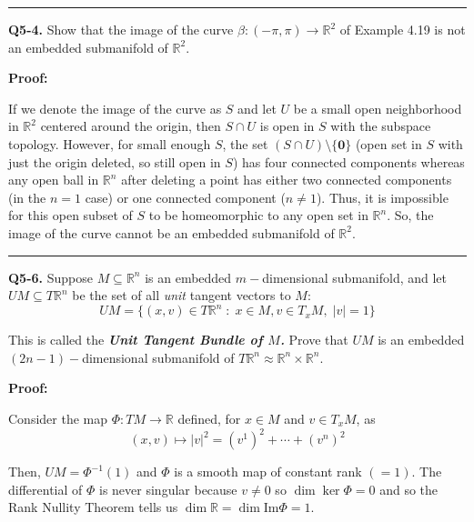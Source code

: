 \documentclass{article}
\newcommand{\R}{\mathbb{R}}
\begin{document}
\vskip 0.5cm


\vskip 0.5cm
\hrule 
\vskip 0.5cm




\textbf{Q5-4.} Show that the image of the curve $\beta : (-\pi, \pi) \rightarrow \R^2$ of Example 4.19 is not an embedded submanifold of $\R^2$. 

\vskip 0.5cm
\textbf{Proof:}


If we denote the image of the curve as $S$ and let $U$ be a small open neighborhood in $\R^2$ centered around the origin, then $S \cap U$ is open in $S$ with the subspace topology. However, for small enough $S$, the set $\left(S \cap U\right) \setminus \{\mathbf{0}\}$ (open set in $S$ with just the origin deleted, so still open in $S$) has four connected components whereas any open ball in $\R^n$ after deleting a point has either two connected components (in the $n = 1$ case) or one connected component ($n \neq 1$). Thus, it is impossible for this open subset of $S$ to be homeomorphic to any open set in $\R^n$. So, the image of the curve cannot be an embedded submanifold of $\R^2$.

\vskip 0.5cm
\hrule 
\vskip 0.5cm




\textbf{Q5-6.} Suppose $M \subseteq \R^n$ is an embedded $m-$dimensional submanifold, and let $UM \subseteq T \R^n$ be the set of all \emph{unit} tangent vectors to $M$:
\[ UM = \{ (x, v) \in T \R^n \; : \; x\in M, v \in T_{x} M, \; \left| v \right| = 1 \} \]

This is called the \emph{\textbf{Unit Tangent Bundle of $M$.}} Prove that $UM$ is an embedded  $(2n-1)-$dimensional submanifold of $T \R^n \approx \R^n \times \R^{n}$.

\vskip 0.5cm
\textbf{Proof:}

Consider the map $\Phi : TM \rightarrow \R$ defined, for $x \in M$ and $v \in T_x M$, as 
\[ (x, v) \mapsto |v|^2 = (v^1)^2 + \cdots + (v^n)^2 \]

Then, $UM = \Phi^{-1}(1)$ and $\Phi$ is a smooth map of constant rank $( = 1)$. The differential of $\Phi$ is never singular because $v \neq 0$ so $\dim \ker \Phi = 0$ and so the Rank Nullity Theorem tells us $\dim \R = \dim \mathrm{Im}\Phi = 1$. 
\end{document}
